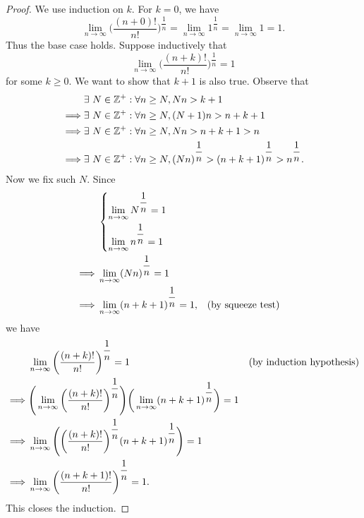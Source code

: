 \begin{proof}
  We use induction on \(k\).
  For \(k = 0\), we have
  \[
    \lim_{n \to \infty} \bigg(\dfrac{(n + 0)!}{n!}\bigg)^{\dfrac{1}{n}} = \lim_{n \to \infty} 1^{\dfrac{1}{n}} = \lim_{n \to \infty} 1 = 1.
  \]
  Thus the base case holds.
  Suppose inductively that
  \[
    \lim_{n \to \infty} \bigg(\dfrac{(n + k)!}{n!}\bigg)^{\dfrac{1}{n}} = 1
  \]
  for some \(k \geq 0\).
  We want to show that \(k + 1\) is also true.
  Observe that
  \begin{align*}
             & \exists\ N \in \mathbb{Z}^+ : \forall n \geq N, Nn > k + 1                                                           \\
    \implies & \exists\ N \in \mathbb{Z}^+ : \forall n \geq N, (N + 1)n > n + k + 1                                                 \\
    \implies & \exists\ N \in \mathbb{Z}^+ : \forall n \geq N, Nn > n + k + 1 > n                                                   \\
    \implies & \exists\ N \in \mathbb{Z}^+ : \forall n \geq N, (Nn)^{\dfrac{1}{n}} > (n + k + 1)^{\dfrac{1}{n}} > n^{\dfrac{1}{n}}.
  \end{align*}
  Now we fix such \(N\).
  Since
  \begin{align*}
             & \begin{dcases}
                 \lim_{n \to \infty} N^{\dfrac{1}{n}} = 1 \\ %
                 \lim_{n \to \infty} n^{\dfrac{1}{n}} = 1 %
               \end{dcases}                                \\
    \implies & \lim_{n \to \infty} (Nn)^{\dfrac{1}{n}} = 1                                                                          \\
    \implies & \lim_{n \to \infty} (n + k + 1)^{\dfrac{1}{n}} = 1,                                    &  & \text{(by squeeze test)}
  \end{align*}
  we have
  \begin{align*}
             & \lim_{n \to \infty} \bigg(\dfrac{(n + k)!}{n!}\bigg)^{\dfrac{1}{n}} = 1                                                                        &  & \text{(by induction hypothesis)} \\
    \implies & \Bigg(\lim_{n \to \infty} \bigg(\dfrac{(n + k)!}{n!}\bigg)^{\dfrac{1}{n}}\Bigg) \bigg(\lim_{n \to \infty} (n + k + 1)^{\dfrac{1}{n}}\bigg) = 1            \\
    \implies & \lim_{n \to \infty} \Bigg(\bigg(\dfrac{(n + k)!}{n!}\bigg)^{\dfrac{1}{n}} (n + k + 1)^{\dfrac{1}{n}}\Bigg) = 1                                            \\
    \implies & \lim_{n \to \infty} \bigg(\dfrac{(n + k + 1)!}{n!}\bigg)^{\dfrac{1}{n}} = 1.
  \end{align*}
  This closes the induction.
\end{proof}

